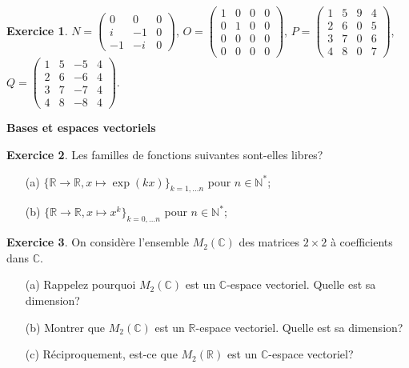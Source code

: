 \documentclass[11pt,a4paper]{article}
\theoremstyle{definition}
\newtheorem{exo}{Exercice}
\newcommand{\N}{\mathbb{N}}
\newcommand{\R}{\mathbb{R}}
\newcommand{\C}{\mathbb{C}}
\begin{document}
\begin{exo}
\noindent
$N =  \begin{pmatrix}
0 & 0 & 0 \\
i & -1 & 0 \\
-1 & -i & 0
\end{pmatrix}$,
$O =  \begin{pmatrix}
1 & 0 & 0 & 0\\
0 & 1 & 0 & 0 \\
0 & 0 & 0 & 0 \\
0 & 0 & 0 & 0 
\end{pmatrix}$,
$P =  \begin{pmatrix}
1 & 5 & 9 & 4\\
2 & 6 & 0 & 5 \\
3 & 7 & 0 & 6 \\
4 & 8 & 0 & 7 
\end{pmatrix}$,
$Q =  \begin{pmatrix}
1 & 5 & -5 & 4\\
2 & 6 & -6& 4 \\
3 & 7 & -7& 4 \\
4 & 8 & -8 & 4 
\end{pmatrix}$.

\end{exo}



{\bfseries
Bases et espaces vectoriels
}
\begin{exo}
Les familles de fonctions suivantes sont-elles libres?
\begin{itemize}
\item[(a)] $\{\R \rightarrow \R, x \mapsto \exp(kx)\}_{k=1, \ldots n}$ pour $n \in \N^*$;
\item[(b)] $\{\R \rightarrow \R, x \mapsto x^k\}_{k=0, \ldots n}$ pour $n \in \N^*$;
   \end{itemize}
\end{exo}

\begin{exo}
On considère l'ensemble $M_2(\C)$ des matrices $2\times2$ à coefficients dans $\C$.
\begin{itemize}
\item[(a)] Rappelez pourquoi $M_2(\C)$ est un $\C$-espace vectoriel. Quelle est sa dimension?
\item[(b)] Montrer que $M_2(\C)$ est un $\R$-espace vectoriel. Quelle est sa dimension?
\item[(c)] Réciproquement, est-ce que $M_2(\R)$ est un $\C$-espace vectoriel?
   \end{itemize}
\end{exo}
\end{document}
